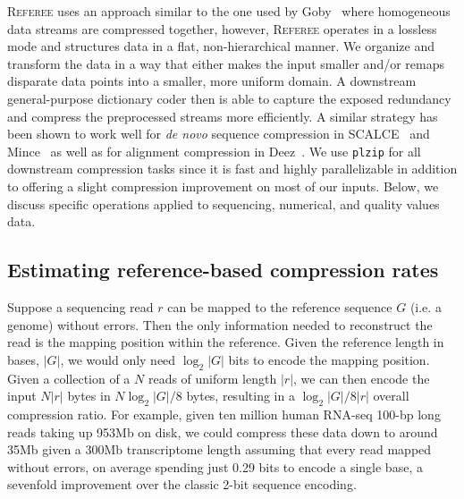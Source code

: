\documentclass[12pt]{cmuthesis}
\newcommand{\refer}{\textsc{Referee}\xspace}
\begin{document}
  \refer uses an approach similar to the one used by Goby~\cite{Goby} where homogeneous data streams are compressed together, however, \refer operates in a lossless mode and structures data in a flat, non-hierarchical manner. We organize and transform the data in a way that either makes the input smaller and/or remaps disparate data points into a smaller, more uniform domain. A downstream general-purpose dictionary coder then is able to capture the exposed redundancy and compress the preprocessed streams more efficiently. A similar strategy has been shown to work well for \textit{de novo} sequence compression in SCALCE~\cite{Sahinalp2012} and Mince~\cite{Mince} as well as for alignment compression in Deez~\cite{Sahinalp2015}. We use \texttt{plzip} for all downstream compression tasks since it is fast and highly parallelizable in addition to offering a slight compression improvement on most of our inputs. Below, we discuss specific operations applied to sequencing, numerical, and quality values data.

  \subsection{Estimating reference-based compression rates}
  \label{sec:seq-comp-methods}


  Suppose a sequencing read $r$ can be mapped to the reference sequence $G$ (i.e. a genome) without errors. Then the only information needed to reconstruct the read is the mapping position within the reference. Given the reference length in bases, $|G|$, we would only need $\log_2 |G|$ bits to encode the mapping position. Given a collection of a $N$ reads of uniform length $|r|$, we can then encode the input $N|r|$ bytes in $N \log_2|G| / 8$ bytes, resulting in a $\log_2|G| / 8|r|$ overall compression ratio. For example, given ten million human RNA-seq 100-bp long reads taking up 953Mb on disk, we could compress these data down to around 35Mb given a 300Mb transcriptome length assuming that every read mapped without errors, on average spending just 0.29 bits to encode a single base, a sevenfold improvement over the classic 2-bit sequence encoding.

\end{document}
